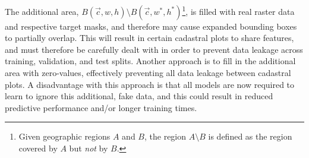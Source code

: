 The additional area, $B(\vec{c}, w, h) \setminus B(\vec{c}, w^*, h^*)$\footnote{Given geographic regions $A$ and $B$, the region $A \setminus B$ is defined as the region covered by $A$ but \emph{not} by $B$.}, is filled with real raster data and respective target masks, and therefore may cause expanded bounding boxes to partially overlap.
This will result in certain cadastral plots to share features, and must therefore be carefully dealt with in order to prevent data leakage across training, validation, and test splits.
Another approach is to fill in the additional area with zero-values, effectively preventing all data leakage between cadastral plots.
A disadvantage with this approach is that all models are now required to learn to ignore this additional, fake data, and this could result in reduced predictive performance and/or longer training times.
\clearpage
